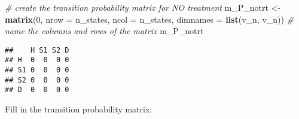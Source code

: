 \documentclass[
]{article}
\newenvironment{Shaded}{\begin{snugshade}}{\end{snugshade}}
\newcommand{\CommentTok}[1]{\textcolor[rgb]{0.56,0.35,0.01}{\textit{#1}}}
\newcommand{\DataTypeTok}[1]{\textcolor[rgb]{0.13,0.29,0.53}{#1}}
\newcommand{\DecValTok}[1]{\textcolor[rgb]{0.00,0.00,0.81}{#1}}
\newcommand{\KeywordTok}[1]{\textcolor[rgb]{0.13,0.29,0.53}{\textbf{#1}}}
\newcommand{\NormalTok}[1]{#1}
\newcommand{\StringTok}[1]{\textcolor[rgb]{0.31,0.60,0.02}{#1}}
\begin{document}
\begin{Shaded}
\begin{Highlighting}[]
\CommentTok{# create the transition probability matrix for NO treatment}
\NormalTok{m_P_notrt  <-}\StringTok{ }\KeywordTok{matrix}\NormalTok{(}\DecValTok{0}\NormalTok{,}
                     \DataTypeTok{nrow =}\NormalTok{ n_states,}
                     \DataTypeTok{ncol =}\NormalTok{ n_states,}
                     \DataTypeTok{dimnames =} \KeywordTok{list}\NormalTok{(v_n, v_n)) }\CommentTok{# name the columns and rows of the matrix}
\NormalTok{m_P_notrt}
\end{Highlighting}
\end{Shaded}

\begin{verbatim}
##    H S1 S2 D
## H  0  0  0 0
## S1 0  0  0 0
## S2 0  0  0 0
## D  0  0  0 0
\end{verbatim}

Fill in the transition probability matrix:
\end{document}
